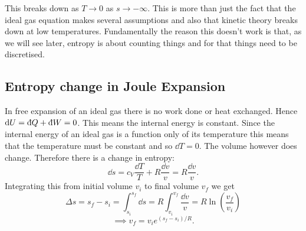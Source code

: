 \documentclass[a4paper]{article}
\newcommand{\ddbar}[1]{\text{\dj}{#1}}
\begin{document}
    This breaks down as \(T \to 0\) as \(s\to-\infty\).
    This is more than just the fact that the ideal gas equation makes several assumptions and also that kinetic theory breaks down at low temperatures.
    Fundamentally the reason this doesn't work is that, as we will see later, entropy is about counting things and for that things need to be discretised.
    
    \subsection{Entropy change in Joule Expansion}
    In free expansion of an ideal gas there is no work done or heat exchanged.
    Hence \(\dd{U} = \ddbar{Q} + \ddbar{W} = 0\).
    This means the internal energy is constant.
    Since the internal energy of an ideal gas is a function only of its temperature this means that the temperature must be constant and so \(\dd{T} = 0\).
    The volume however does change.
    Therefore there is a change in entropy:
    \[\dd{s} = c_V\frac{\dd{T}}{T} + R\frac{\dd{v}}{v} = R\frac{\dd{v}}{v}.\]
    Integrating this from initial volume \(v_i\) to final volume \(v_f\) we get
    \[\Delta s = s_f - s_i = \int_{s_i}^{s_f}\dd{s} = R\int_{v_i}^{v_f}\frac{\dd{v}}{v} = R\ln\left(\frac{v_f}{v_i}\right)\]
    \[\implies v_f = v_ie^{(s_f - s_i)/R}.\]
    
\end{document}
